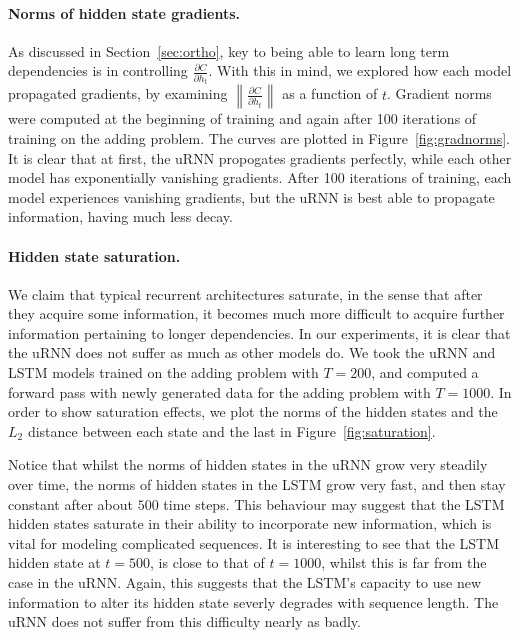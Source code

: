 \documentclass{article} %
\newcommand\norm[1]{\left\lVert#1\right\rVert}
\begin{document}
\paragraph{Norms of hidden state gradients.} As discussed in Section~\ref{sec:ortho}, key to being able to learn long term 
dependencies is in controlling $\frac{\partial C}{\partial h_t}$. 
With this in mind, we explored how each model propagated gradients, by examining 
$\norm{\frac{\partial C}{\partial h_t}}$ as a function of $t$. 
Gradient norms were computed at the beginning of training and again after 100 iterations of
training on the adding problem. The curves are plotted in Figure~\ref{fig:gradnorms}.
It is clear that at first, the uRNN propogates gradients perfectly, while each other model has 
exponentially vanishing gradients. 
After 100 iterations of training, each model experiences vanishing gradients, 
but the uRNN is best able to propagate information, having much less decay.

\paragraph{Hidden state saturation.} We claim that typical recurrent architectures saturate, in the 
sense that after they acquire some information, it becomes much more difficult to acquire further information pertaining
to longer dependencies. In our experiments, it is clear that the uRNN does not suffer as much as other models do. 
We took the uRNN and LSTM models trained on the adding problem with $T=200$, and computed 
a forward pass with newly generated data for the adding problem with $T=1000$. In order to show saturation
effects, we plot the norms of the hidden states and the $L_2$ distance between each state and the last in
Figure~\ref{fig:saturation}.    

Notice that whilst the norms of hidden states in the uRNN grow very steadily over time, the norms of hidden
states in the LSTM grow very fast, and then stay constant after about $500$ time steps. This behaviour may
suggest that the LSTM hidden states saturate in their ability to incorporate new information, which is vital
for modeling complicated sequences. It is interesting to see that the LSTM hidden state at $t=500$, 
is close to that of $t=1000$, whilst this is far from the case in the uRNN. Again, this suggests that
the LSTM's capacity to use new information to alter its hidden state severly degrades with sequence length.
The uRNN does not suffer from this difficulty nearly as badly. 
\end{document}
